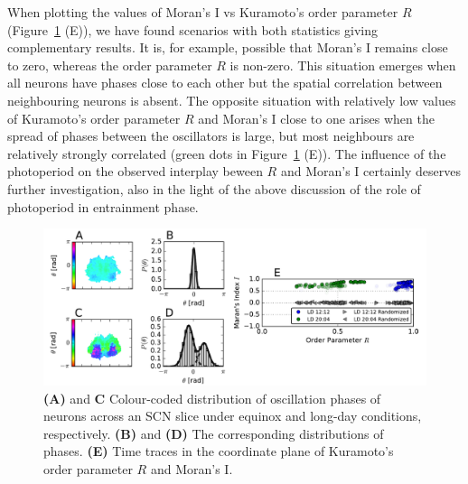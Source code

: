 When plotting the values of Moran's I vs Kuramoto's order parameter
$R$ (Figure~\ref{fig::mi} (E)), we have found scenarios with both
statistics giving complementary results. It is, for example, possible
that Moran's I remains close to zero, whereas the order parameter $R$
is non-zero. This situation emerges when all neurons have phases close
to each other but the spatial correlation between neighbouring neurons
is absent. The opposite situation with relatively low values of
Kuramoto's order parameter $R$ and Moran's I close to one arises when
the spread of phases between the oscillators is large, but most
neighbours are relatively strongly correlated (green dots in
Figure~\ref{fig::mi} (E)). The influence of the photoperiod on the
observed interplay beween $R$ and Moran's I certainly deserves further
investigation, also in the light of the above discussion of the role
of photoperiod in entrainment phase.

\begin{figure}
\begin{center}
\includegraphics[width=\linewidth]{figures/mi/mi.pdf}
\end{center}
\caption{
  {\bf (A)} and {\bf {C}} Colour-coded distribution of oscillation
  phases of neurons across an SCN slice under equinox and long-day
  conditions, respectively.
  {\bf (B)} and {\bf (D)} The corresponding distributions of phases.
  {\bf (E)} Time traces in the coordinate plane of Kuramoto's order
  parameter $R$ and Moran's I.
\label{fig::mi}
}
\end{figure}
